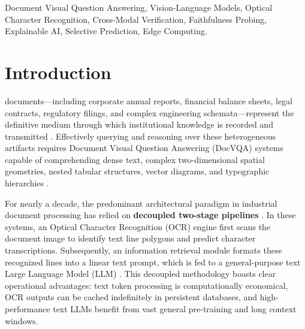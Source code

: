 \documentclass[conference]{IEEEtran}
\begin{document}
\begin{abstract}
Rigorous empirical evaluation on the DocVQA benchmark ($N=200$ validation items) demonstrates that the native VLM outperforms the decoupled pipeline by \textbf{+29.78\%} in Average Normalized Levenshtein Similarity (ANLS $0.9057$ vs. $0.6079$) and \textbf{+35.5\%} in Exact Match (EM $85.5\%$ vs. $50.0\%$), achieving overwhelming statistical significance ($p = 1.01 \times 10^{-18}$, McNemar test) while reducing mean inference latency from $3,406.2$\,ms to $1,096.4$\,ms. We reveal that \textbf{25.5\%} of decoupled pipeline failures originate from an absolute OCR answer-coverage ceiling where ground-truth tokens are entirely omitted from OCR text. Furthermore, our calibrated trust scoring achieves an AUROC of \textbf{0.7873} (outperforming raw agreement AUROC of $0.7042$), delivering \textbf{100\% precision} at up to $50\%$ selective prediction coverage. Finally, we provide full system telemetry, extensive ablation experiments, and detailed failure case studies.
\end{abstract}

\begin{IEEEkeywords}
Document Visual Question Answering, Vision-Language Models, Optical Character Recognition, Cross-Modal Verification, Faithfulness Probing, Explainable AI, Selective Prediction, Edge Computing.
\end{IEEEkeywords}

\section{Introduction}
 documents---including corporate annual reports, financial balance sheets, legal contracts, regulatory filings, and complex engineering schemata---represent the definitive medium through which institutional knowledge is recorded and transmitted \cite{b1, b2}. Effectively querying and reasoning over these heterogeneous artifacts requires Document Visual Question Answering (DocVQA) systems capable of comprehending dense text, complex two-dimensional spatial geometries, nested tabular structures, vector diagrams, and typographic hierarchies \cite{b3}.

For nearly a decade, the predominant architectural paradigm in industrial document processing has relied on \textbf{decoupled two-stage pipelines} \cite{b4}. In these systems, an Optical Character Recognition (OCR) engine first scans the document image to identify text line polygons and predict character transcriptions. Subsequently, an information retrieval module formats these recognized lines into a linear text prompt, which is fed to a general-purpose text Large Language Model (LLM) \cite{b5, b6}. This decoupled methodology boasts clear operational advantages: text token processing is computationally economical, OCR outputs can be cached indefinitely in persistent databases, and high-performance text LLMs benefit from vast general pre-training and long context windows.
\end{document}
